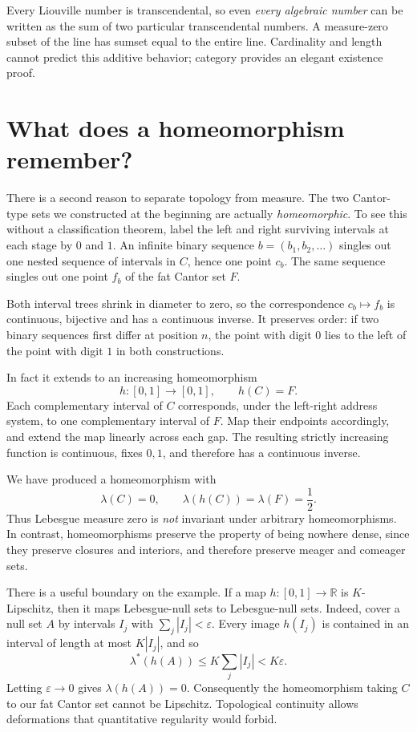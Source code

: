 Every Liouville number is transcendental, so even \emph{every algebraic number} can be written as the sum of two particular transcendental numbers. A measure-zero subset of the line has sumset equal to the entire line. Cardinality and length cannot predict this additive behavior; category provides an elegant existence proof.

\section{What does a homeomorphism remember?}

There is a second reason to separate topology from measure. The two Cantor-type sets we constructed at the beginning are actually \emph{homeomorphic}. To see this without a classification theorem, label the left and right surviving intervals at each stage by \(0\) and \(1\). An infinite binary sequence \(b=(b_1,b_2,\ldots)\) singles out one nested sequence of intervals in \(C\), hence one point \(c_b\). The same sequence singles out one point \(f_b\) of the fat Cantor set \(F\).

Both interval trees shrink in diameter to zero, so the correspondence \(c_b\mapsto f_b\) is continuous, bijective and has a continuous inverse. It preserves order: if two binary sequences first differ at position \(n\), the point with digit \(0\) lies to the left of the point with digit \(1\) in both constructions.

In fact it extends to an increasing homeomorphism
\[
 h:[0,1]\longrightarrow[0,1],
 \qquad h(C)=F.
\]
Each complementary interval of \(C\) corresponds, under the left-right address system, to one complementary interval of \(F\). Map their endpoints accordingly, and extend the map linearly across each gap. The resulting strictly increasing function is continuous, fixes \(0,1\), and therefore has a continuous inverse.

We have produced a homeomorphism with
\[
 \lambda(C)=0,\qquad
 \lambda(h(C))=\lambda(F)=\frac12.
\]
Thus Lebesgue measure zero is \emph{not} invariant under arbitrary homeomorphisms. In contrast, homeomorphisms preserve the property of being nowhere dense, since they preserve closures and interiors, and therefore preserve meager and comeager sets.

There is a useful boundary on the example. If a map \(h:[0,1]\to\mathbb R\) is \(K\)-Lipschitz, then it maps Lebesgue-null sets to Lebesgue-null sets. Indeed, cover a null set \(A\) by intervals \(I_j\) with \(\sum_j|I_j|<\varepsilon\). Every image \(h(I_j)\) is contained in an interval of length at most \(K|I_j|\), and so
\[
 \lambda^*(h(A))\le K\sum_j|I_j|<K\varepsilon.
\]
Letting \(\varepsilon\to0\) gives \(\lambda(h(A))=0\). Consequently the homeomorphism taking \(C\) to our fat Cantor set cannot be Lipschitz. Topological continuity allows deformations that quantitative regularity would forbid.

